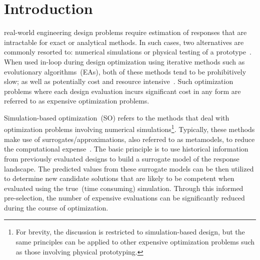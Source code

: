 \section{Introduction}
% 
% 
% 
% 

 real-world engineering design problems require estimation of responses that are intractable for exact or analytical methods. In such cases, two alternatives are commonly resorted to: numerical simulations or physical testing of a prototype~\cite{forrester2008engineering}. When used in-loop during design optimization using iterative methods such as evolutionary algorithms~(EAs), both of these methods tend to be prohibitively slow; as well as potentially cost and resource intensive~\cite{jin2009systems}. Such optimization problems where each design evaluation incurs significant cost in any form are referred to as expensive optimization problems.

Simulation-based optimization~(SO) refers to the methods that deal with optimization problems involving  numerical simulations\footnote{For brevity, the discussion is restricted to simulation-based design, but the same principles can be applied to other expensive optimization problems such as those involving physical prototyping.}. Typically, these methods make use of surrogates/approximations, also referred to as metamodels, to reduce the computational expense~\cite{amaran2016simulation}. The basic principle is to use historical information from previously evaluated designs to build a surrogate model of the response landscape. The predicted values from these surrogate models can be then utilized to determine new candidate solutions that are likely to be competent when evaluated using the true~(time consuming) simulation. Through this informed pre-selection, the number of expensive evaluations can be significantly reduced during the course of optimization. 

